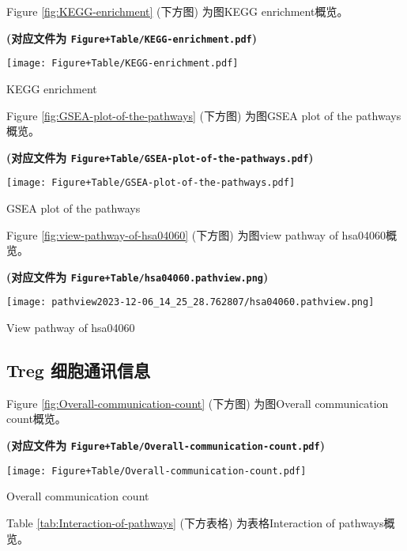 \documentclass[
]{article}
\begin{document}
Figure \ref{fig:KEGG-enrichment} (下方图) 为图KEGG enrichment概览。

\textbf{(对应文件为 \texttt{Figure+Table/KEGG-enrichment.pdf})}

\def\@captype{figure}
\begin{center}
\texttt{[image: Figure+Table/KEGG-enrichment.pdf]}
\caption{KEGG enrichment}\label{fig:KEGG-enrichment}
\end{center}

Figure \ref{fig:GSEA-plot-of-the-pathways} (下方图) 为图GSEA plot of the pathways概览。

\textbf{(对应文件为 \texttt{Figure+Table/GSEA-plot-of-the-pathways.pdf})}

\def\@captype{figure}
\begin{center}
\texttt{[image: Figure+Table/GSEA-plot-of-the-pathways.pdf]}
\caption{GSEA plot of the pathways}\label{fig:GSEA-plot-of-the-pathways}
\end{center}

Figure \ref{fig:view-pathway-of-hsa04060} (下方图) 为图view pathway of hsa04060概览。

\textbf{(对应文件为 \texttt{Figure+Table/hsa04060.pathview.png})}

\def\@captype{figure}
\begin{center}
\texttt{[image: pathview2023-12-06\_14\_25\_28.762807/hsa04060.pathview.png]}
\caption{View pathway of hsa04060}\label{fig:view-pathway-of-hsa04060}
\end{center}

\hypertarget{treg-ux7ec6ux80deux901aux8bafux4fe1ux606f}{%
\subsection{Treg 细胞通讯信息}\label{treg-ux7ec6ux80deux901aux8bafux4fe1ux606f}}

Figure \ref{fig:Overall-communication-count} (下方图) 为图Overall communication count概览。

\textbf{(对应文件为 \texttt{Figure+Table/Overall-communication-count.pdf})}

\def\@captype{figure}
\begin{center}
\texttt{[image: Figure+Table/Overall-communication-count.pdf]}
\caption{Overall communication count}\label{fig:Overall-communication-count}
\end{center}

Table \ref{tab:Interaction-of-pathways} (下方表格) 为表格Interaction of pathways概览。
\end{document}
